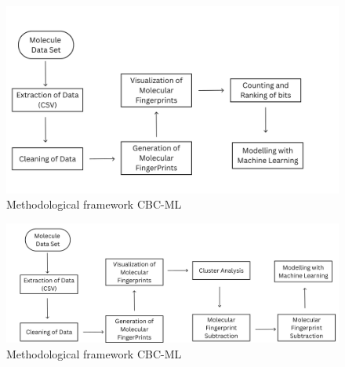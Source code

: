 \begin{figure}[h] %
	\centering
    \includegraphics[scale = 0.33]{cbcv2.png}
    \vspace{-1cm} %
    \caption{Methodological framework CBC-ML}
    \label{fig:CBC} %
\end{figure}


\begin{figure}[h] %
    \centering
    \hspace{-1.05cm}
    \includegraphics[scale=0.22]{csbcv2.png} %
    \caption{Methodological framework CBC-ML}
    \label{fig:CSBC} %
\end{figure}

